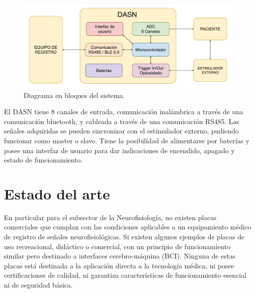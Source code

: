 \vspace{1cm}

\begin{figure}[htbp]
	\centering
	\includegraphics[width=1\textwidth]{./Figures/DiagramaEnBloquesDASN.pdf}
	\caption{Diagrama en bloques del sistema.}
	\label{fig:diagBloquesSistema}
\end{figure}

\vspace{1cm}

El DASN tiene 8 canales de entrada, comunicación inalámbrica a través de una comunicación bluetooth, y cableada a través de una comunicación RS485. Las señales adquiridas se pueden sincronizar con el estimulador externo, pudiendo funcionar como master o slave. Tiene la posibilidad de alimentarse por baterías y posee una interfaz de usuario para dar indicaciones de encendido, apagado y estado de funcionamiento.

\section{Estado del arte}
En particular para el subsector de la Neurofisiología, no existen placas comerciales que cumplan con las condiciones aplicables a un equipamiento médico de registro de señales neurofisiológicas. Si existen algunos ejemplos de placas de uso recreacional, didáctico o comercial, con un principio de funcionamiento similar pero destinado a interfaces cerebro-máquina (BCI). Ninguna de estas placas está destinada a la aplicación directa a la tecnología médica, ni posee certificaciones de calidad, ni garantiza características de funcionamiento esencial ni de seguridad básica.


